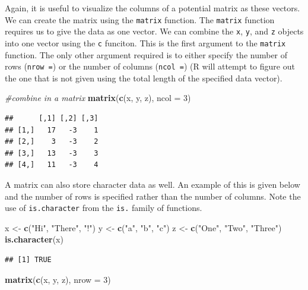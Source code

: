 \documentclass[
]{book}
\newenvironment{Shaded}{\begin{snugshade}}{\end{snugshade}}
\newcommand{\CommentTok}[1]{\textcolor[rgb]{0.56,0.35,0.01}{\textit{#1}}}
\newcommand{\DataTypeTok}[1]{\textcolor[rgb]{0.13,0.29,0.53}{#1}}
\newcommand{\DecValTok}[1]{\textcolor[rgb]{0.00,0.00,0.81}{#1}}
\newcommand{\KeywordTok}[1]{\textcolor[rgb]{0.13,0.29,0.53}{\textbf{#1}}}
\newcommand{\NormalTok}[1]{#1}
\newcommand{\StringTok}[1]{\textcolor[rgb]{0.31,0.60,0.02}{#1}}
\theoremstyle{definition}
\theoremstyle{definition}
\theoremstyle{definition}
\theoremstyle{remark}
\begin{document}
Again, it is useful to visualize the columns of a potential matrix as these vectors. We can create the matrix using the \texttt{matrix} function. The \texttt{matrix} function requires us to give the data as one vector. We can combine the \texttt{x}, \texttt{y}, and \texttt{z} objects into one vector using the \texttt{c} funciton. This is the first argument to the \texttt{matrix} function. The only other argument required is to either specify the number of rows (\texttt{nrow\ =}) or the number of columns (\texttt{ncol\ =}) (R will attempt to figure out the one that is not given using the total length of the specified data vector).

\begin{Shaded}
\begin{Highlighting}[]
\CommentTok{#combine in a matrix}
\KeywordTok{matrix}\NormalTok{(}\KeywordTok{c}\NormalTok{(x, y, z), }\DataTypeTok{ncol =} \DecValTok{3}\NormalTok{)}
\end{Highlighting}
\end{Shaded}

\begin{verbatim}
##      [,1] [,2] [,3]
## [1,]   17   -3    1
## [2,]    3   -3    2
## [3,]   13   -3    3
## [4,]   11   -3    4
\end{verbatim}

A matrix can also store character data as well. An example of this is given below and the number of rows is specified rather than the number of columns. Note the use of \texttt{is.character} from the \texttt{is.} family of functions.

\begin{Shaded}
\begin{Highlighting}[]
\NormalTok{x <-}\StringTok{ }\KeywordTok{c}\NormalTok{(}\StringTok{"Hi"}\NormalTok{, }\StringTok{"There"}\NormalTok{, }\StringTok{"!"}\NormalTok{)}
\NormalTok{y <-}\StringTok{ }\KeywordTok{c}\NormalTok{(}\StringTok{"a"}\NormalTok{, }\StringTok{"b"}\NormalTok{, }\StringTok{"c"}\NormalTok{)}
\NormalTok{z <-}\StringTok{ }\KeywordTok{c}\NormalTok{(}\StringTok{"One"}\NormalTok{, }\StringTok{"Two"}\NormalTok{, }\StringTok{"Three"}\NormalTok{)}
\KeywordTok{is.character}\NormalTok{(x)}
\end{Highlighting}
\end{Shaded}

\begin{verbatim}
## [1] TRUE
\end{verbatim}

\begin{Shaded}
\begin{Highlighting}[]
\KeywordTok{matrix}\NormalTok{(}\KeywordTok{c}\NormalTok{(x, y, z), }\DataTypeTok{nrow =} \DecValTok{3}\NormalTok{)}
\end{Highlighting}
\end{Shaded}
\end{document}
